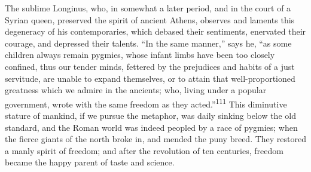 
The sublime Longinus, who, in somewhat a later period, and in the
court of a Syrian queen, preserved the spirit of ancient Athens,
observes and laments this degeneracy of his contemporaries, which
debased their sentiments, enervated their courage, and depressed
their talents. “In the same manner,” says he, “as some children
always remain pygmies, whose infant limbs have been too closely
confined, thus our tender minds, fettered by the prejudices and
habits of a just servitude, are unable to expand themselves, or
to attain that well-proportioned greatness which we admire in the
ancients; who, living under a popular government, wrote with the
same freedom as they acted.”\textsuperscript{111} This diminutive stature of
mankind, if we pursue the metaphor, was daily sinking below the
old standard, and the Roman world was indeed peopled by a race of
pygmies; when the fierce giants of the north broke in, and mended
the puny breed. They restored a manly spirit of freedom; and
after the revolution of ten centuries, freedom became the happy
parent of taste and science.


